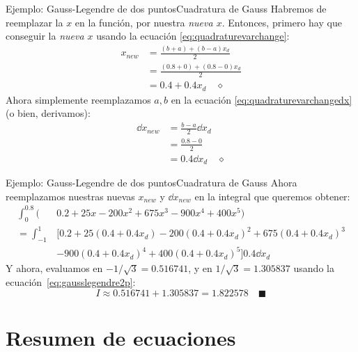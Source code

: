 \documentclass[spanish, c, dvipsnames]{beamer}
\begin{document}
\begin{frame}{Ejemplo: Gauss-Legendre de dos puntos}{Cuadratura de Gauss}
    Habremos de reemplazar la $x$ en la función, por nuestra \textit{nueva $x$}. Entonces, primero hay que conseguir la \textit{nueva $x$} usando la ecuación \ref{eq:quadraturevarchange}:
    \begin{align*}
        x_{new} & = \frac{(b+a) + (b - a)x_d}{2} \\
         & = \frac{(0.8 + 0) + (0.8 - 0)x_d}{2} \\
         & = 0.4 + 0.4x_d \quad \diamond
    \end{align*} \pause
    Ahora simplemente reemplazamos $a,b$ en la ecuación \ref{eq:quadraturevarchangedx} (o bien, derivamos):
    \begin{align*}
        \dd{x_{new}} & = \frac{b - a}{2}\dd{x_d} \\
        & = \frac{0.8 - 0}{2} \\
        & = 0.4\dd{x_d} \quad \diamond
    \end{align*}
\end{frame}

\begin{frame}{Ejemplo: Gauss-Legendre de dos puntos}{Cuadratura de Gauss}
    Ahora reemplazamos nuestras nuevas $x_{new}$ y $\dd{x_{new}}$ en la integral que queremos obtener:
    \begin{align*}
        \int_0^{0.8} \big( & 0.2 + 25x - 200 x^2 + 675 x^3 - 900 x^4 + 400x^5 \big) \\
        = \int_{-1}^1 & \big[ 0.2 + 25(0.4 + 0.4x_d) - 200(0.4 + 0.4x_d)^2 + 675 (0.4 + 0.4x_d)^3 \\
        & -900(0.4 + 0.4x_d)^4 + 400(0.4 + 0.4x_d)^5\big]0.4\dd{x_d}
    \end{align*} \pause
    Y ahora, evaluamos en $-1 / \sqrt{3} = 0.516741$, y en $1 / \sqrt{3} = 1.305837$ usando la ecuación~\ref{eq:gausslegendre2p}:
    $$I \approx 0.516741 + 1.305837 = 1.822578 \quad \blacksquare$$
\end{frame}

\section{Resumen de ecuaciones}
\end{document}
